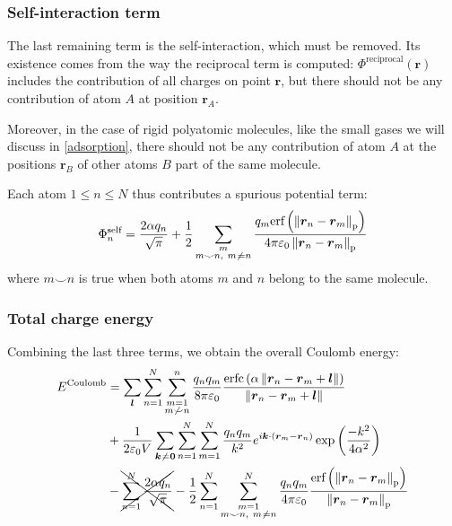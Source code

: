 \documentclass[main.tex]{subfiles}
\begin{document}
\subsubsection{Self-interaction term}

The last remaining term is the self-interaction, which must be removed. Its existence comes from the way the reciprocal term is computed: $\Phi^\text{reciprocal}(\boldsymbol r)$ includes the contribution of all charges on point $\boldsymbol r$, but there should not be any contribution of atom $A$ at position $\boldsymbol r_A$.

Moreover, in the case of rigid polyatomic molecules, like the small gases we will discuss in \cref{adsorption}, there should not be any contribution of atom $A$ at the positions $\boldsymbol r_B$ of other atoms $B$ part of the same molecule.

Each atom $1\le n\le N$ thus contributes a spurious potential term:
\[\Phi^\text{self}_n = \frac{2\alpha q_n}{\sqrt\pi} + \frac12\sum_{\substack{m\\m\smile n,\ m\not\kern0.2ex= n}}\frac{q_m\text{erf}\left(\left\|\boldsymbol r_n - \boldsymbol r_m\right\|_\text{p}\right)}{4\pi\varepsilon_0\left\|\boldsymbol r_n - \boldsymbol r_m\right\|_\text{p}}\]
where $m\smile n$ is true when both atoms $m$ and $n$ belong to the same molecule.

\subsubsection{Total charge energy}

Combining the last three terms, we obtain the overall Coulomb energy:
\[\begin{split}
E^\text{Coulomb} &= \sum_{\boldsymbol l} \sum_{n=1}^N\sum_{\substack{m=1\\m\not\smile n}}^n \frac{q_n q_m}{8\pi\varepsilon_0}\frac{\text{erfc}\left(\alpha\left\|\boldsymbol r_n - \boldsymbol r_m + \boldsymbol l\right\|\right)}{\left\|\boldsymbol r_n - \boldsymbol r_m + \boldsymbol l\right\|}
\\&+ \frac1{2\varepsilon_0V} \sum_{\boldsymbol{k}\not\kern0.2ex=\boldsymbol{0}}\sum_{n=1}^N\sum_{m=1}^N \frac{q_n q_m}{k^2}e^{i\boldsymbol k\cdot\left(\boldsymbol r_m - \boldsymbol r_n\right)}\exp\left(\frac{-k^2}{4\alpha^2}\right)
\\&- \xcancel{\sum_{n=1}^N\frac{2\alpha q_n}{\sqrt\pi}}
- \frac12\sum_{n=1}^N\sum_{\substack{m=1\\m\smile n,\ m\not\kern0.2ex= n}}^N \frac{q_n q_m}{4\pi\varepsilon_0}\frac{\text{erf}\left(\left\|\boldsymbol r_n - \boldsymbol r_m\right\|_\text{p}\right)}{\left\|\boldsymbol r_n - \boldsymbol r_m\right\|_\text{p}}
\label{eq:totalcoulombenergy}\end{split}\]
\end{document}

